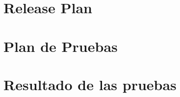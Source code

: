 \documentclass[onehalfspace]{USB}
\begin{document}




%
% 
% 

\renewcommand\bibname{REFERENCIAS}

\appendix



\chapter{Release Plan}


\chapter{Plan de Pruebas}


\chapter{Resultado de las pruebas}

\end{document}

